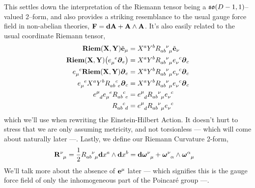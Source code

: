 This settles down the interpretation of the Riemann tensor being a $\mathfrak{so}\qty(D-1,1)$--valued 2--form, and also provides a striking resemblance to the usual gauge force field in non-abelian 
theories, $\vb F=\vb d\vb A+\vb A\wedge \vb A$. It's also easily related to the usual coordinate Riemann tensor,
\begin{align*}
    \textbf{Riem}\qty(\vb X,\vb Y)\tilde{\vb e}_\mu&=X^aY^b\tensor{R}{_a_b^\nu_\mu}\tilde{\vb e}_\nu\\
    \textbf{Riem}\qty(\vb X,\vb Y)\qty(\tensor{e}{_\mu^e}\boldsymbol\partial_e)&=X^aY^b\tensor{R}{_a_b^\nu_\mu}\tensor{e}{_\nu^c}\boldsymbol\partial_c\\
    \tensor{e}{_\mu^e}\textbf{Riem}\qty(\vb X,\vb Y)\boldsymbol\partial_e&=X^aY^b\tensor{R}{_a_b^\nu_\mu}\tensor{e}{_\nu^c}\boldsymbol\partial_c\\
    \tensor{e}{_\mu^e}X^aY^b\tensor{R}{_a_b^c_e}\boldsymbol\partial_c&=X^aY^b\tensor{R}{_a_b^\nu_\mu}\tensor{e}{_\nu^c}\boldsymbol\partial_c\\
    \tensor{e}{^\mu_d}\tensor{e}{_\mu^e}\tensor{R}{_a_b^c_e}&=\tensor{e}{^\mu_d}\tensor{R}{_a_b^\nu_\mu}\tensor{e}{_\nu^c}\\
    \tensor{R}{_a_b^c_d}&=\tensor{e}{^\mu_d}\tensor{R}{_a_b^\nu_\mu}\tensor{e}{_\nu^c}
\end{align*}
which we'll use when rewriting the Einstein-Hilbert Action. It doesn't hurt to stress that we are only assuming metricity, and not torsionless --- which will come about naturally later ---. 
Lastly, we define our Riemann Curvature 2-form,
\begin{align*}
    \tensor{{\vb R}}{^\nu_\mu}&=\frac12\tensor{R}{_a_b^\nu_\mu}\vb d{x^a}\wedge\vb d{x^b}=\tensor{\vb d{\boldsymbol\omega}}{^\nu_\mu}+\tensor{{\boldsymbol\omega}}{^\nu_\alpha}\wedge\tensor{{\boldsymbol\omega}}{^\alpha_\mu}%
\end{align*}
We'll talk more about the absence of $\vb e^\mu$ later --- which signifies this is the gauge force field of only the inhomogeneous part of the Poincaré group ---.


